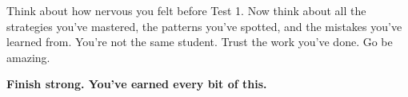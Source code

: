 {\begin{tcolorbox}[
    enhanced,
    colback=funYellowLight,
    colframe=funYellow!60,
    arc=10pt,
    boxrule=1pt,
    left=6mm, right=6mm, top=4mm, bottom=4mm,
]
\vspace{2mm}

Think about how nervous you felt before Test 1. Now think about all the strategies you've mastered, the patterns you've spotted, and the mistakes you've learned from. You're not the same student. Trust the work you've done. Go be amazing.
\end{tcolorbox}

\vspace{4mm}

\begin{center}
{\large\bfseries\color{funTealDark} \faMedal\hspace{2mm}Finish strong. You've earned every bit of this.\hspace{2mm}\faMedal}
\end{center}

}
\newpage
